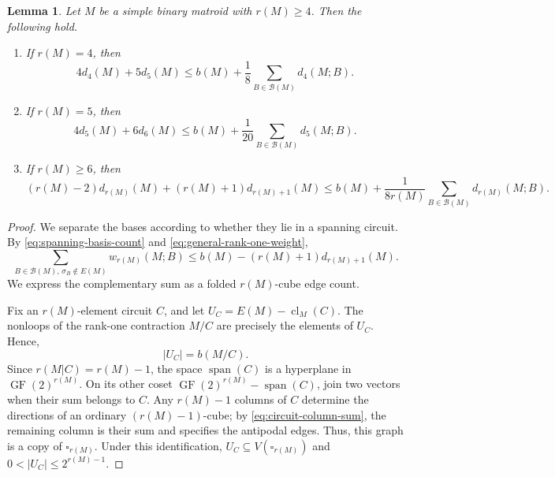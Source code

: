 \documentclass[11pt]{article}
\numberwithin{equation}{section}
\newtheorem{lemma}[lemma]{Lemma}
\DeclareMathOperator{\GF}{GF}
\DeclareMathOperator{\cl}{cl}
\DeclareMathOperator{\spanof}{span}
\newcommand{\BB}{\mathcal B}
\newcommand{\FF}{\GF(2)}
\newcommand{\wloc}[1]{w_{#1}(M;B)}
\newcommand{\dloc}[1]{d_{#1}(M;B)}
\begin{document}
\begin{lemma}\label{lem:cube-count}
Let \(M\) be a simple binary matroid with \(r(M)\ge4\).
Then the following hold.
\begin{enumerate}
\item[\(\mathrm{(i)}\)] If \(r(M)=4\), then
\[
 4d_4(M)+5d_5(M)
 \le b(M)+\frac18\sum_{B\in\BB(M)}\dloc4.
\]
\item[\(\mathrm{(ii)}\)] If \(r(M)=5\), then
\[
 4d_5(M)+6d_6(M)
 \le b(M)+\frac1{20}\sum_{B\in\BB(M)}\dloc5.
\]
\item[\(\mathrm{(iii)}\)] If \(r(M)\ge6\), then
\[
 (r(M)-2)d_{r(M)}(M)+(r(M)+1)d_{r(M)+1}(M)
 \le b(M)+\frac1{8r(M)}\sum_{B\in\BB(M)}\dloc{r(M)}.
\]
\end{enumerate}
\end{lemma}
\begin{proof}
We separate the bases according to whether they lie in a spanning circuit.
By \eqref{eq:spanning-basis-count} and \eqref{eq:general-rank-one-weight},
\begin{equation}\label{eq:basis}
 \sum_{B\in\BB(M),\,\sigma_B\notin E(M)}\wloc{r(M)}
 \le b(M)-(r(M)+1)d_{r(M)+1}(M).
\end{equation}
We express the complementary sum as a folded \(r(M)\)-cube edge count.

Fix an \(r(M)\)-element circuit \(C\), and let
\(U_C=E(M)-\cl_M(C)\).
The nonloops of the rank-one contraction \(M/C\) are precisely
the elements of \(U_C\). Hence,
\begin{equation}\label{eq:outside-hyperplane}
 |U_C|=b(M/C).
\end{equation}
Since \(r(M|C)=r(M)-1\), the space \(\spanof(C)\) is a hyperplane in \(\FF^{r(M)}\).
On its other coset \(\FF^{r(M)}-\spanof(C)\), join two vectors
when their sum belongs to \(C\). Any \(r(M)-1\) columns of \(C\) determine the
directions of an ordinary \((r(M)-1)\)-cube; by \eqref{eq:circuit-column-sum},
the remaining column is their sum and specifies the antipodal edges.
Thus, this graph is a copy of \(\square_{r(M)}\). Under this identification,
\(U_C\subseteq V(\square_{r(M)})\) and
\(0<|U_C|\le2^{r(M)-1}\).


\end{proof}
\end{document}
